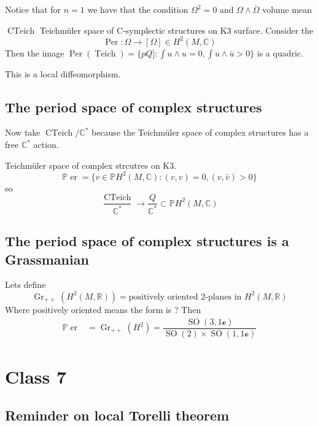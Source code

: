 Notice that for $n=1$ we have that the condition $\Omega^2=0$ and $\Omega\wedge \overline{\Omega}$ volume mean


\begin{thm}\leavevmode
	$\operatorname{CTeich}$ Teichm\"uler space of C-symplectic structures on K3 surface. Consider the
	\[\operatorname{Per}:\Omega\to [\Omega]\in H^{2}(M,\mathbb{C})\]
	Then the image $\operatorname{Per}(\operatorname{Teich})=\{pQ]:\int u\wedge  u=0, \int u\wedge  \bar{u}>0\}$ is a quadric.

	This is a local diffeomorphism.
	
\end{thm}

\subsection{The period space of complex structures}

Now take $\operatorname{CTeich}/\mathbb{C}^*$ because the Teichm\"uler space of complex structures has a free $\mathbb{C}^*$ action.


\begin{prop}
	Teichm\"uler space of complex strcutres on K3.
	\[\mathbb{P}\operatorname{er}=\{v\in\mathbb{P}H^{2}(M,\mathbb{C}):(v,v)=0,(v,\bar{v})>0\}\]
	so
	\[\frac{\operatorname{CTeich}}{\mathbb{C}^*}\longrightarrow \frac{Q}{\mathbb{C}^*}\subset \mathbb{P}H^{2}(M,\mathbb{C})\]
\end{prop}

\subsection{The period space of complex structures is a Grassmanian}

Lets define
\[\operatorname{Gr}_{++}(H^{2}(M,\mathbb{R}))=\text{positively oriented 2-planes in }H^{2}(M,\mathbb{R}) \]
Where positively oriented means the form is ? Then
\begin{align*}
\mathbb{P}\operatorname{er}&=\operatorname{Gr}_{++}(H^{2})=\dfrac{\operatorname{SO}(3,1\mathcal{o})}{\operatorname{SO}(2) \times \operatorname{SO}(1,1\mathcal{o})}
\end{align*}

\section{Class 7}

\subsection{Reminder on local Torelli theorem}

